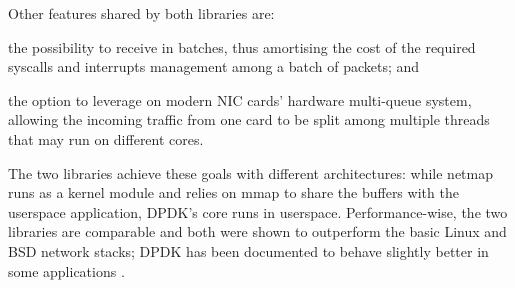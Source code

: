 \documentclass[11pt,a4paper,twoside,titlepage,openany]{book}
\begin{document}
Other features shared by both libraries are:
\begin{inlineenum}
\item the possibility to receive in batches, thus amortising the cost of the required syscalls and interrupts management among a batch of packets; and
\item the option to leverage on modern NIC cards' hardware multi-queue system, allowing the incoming traffic from one card to be split among multiple threads that may run on different cores.
\end{inlineenum}
The two libraries achieve these goals with different architectures: while netmap runs as a kernel module and relies on mmap to share the buffers with the userspace application, DPDK's core runs in userspace.
Performance-wise, the two libraries are comparable and both were shown to outperform the basic Linux and BSD network stacks; DPDK has been documented to behave slightly better in some applications \cite{fastclick}.
\end{document}
